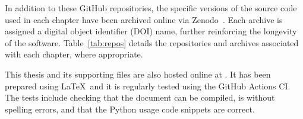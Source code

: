 In addition to these GitHub repositories, the specific versions of the source
code used in each chapter have been archived online via Zenodo~\cite{zenodo}.
Each archive is assigned a digital object identifier (DOI) name, further
reinforcing the longevity of the software. Table~\ref{tab:repos} details the
repositories and archives associated with each chapter, where appropriate.

\begin{table}[tbhp]
    \centering%
    \resizebox{\textwidth}{!}{%
    }\caption{%
        A summary of the repositories and archives associated with the chapters
        of this thesis%
    }\label{tab:repos}
\end{table}

This thesis and its supporting files are also hosted online at
. It has been prepared using \LaTeX\ and it is
regularly tested using the GitHub Actions CI. The tests include checking that
the document can be compiled, is without spelling errors, and that the Python
usage code snippets are correct.
